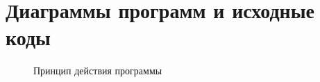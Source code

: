 \chapter{Диаграммы программ и исходные коды}
%
\begin{figure}[hp]
\begin{small}

\end{small}
\caption{Принцип действия программы}
\end{figure}

